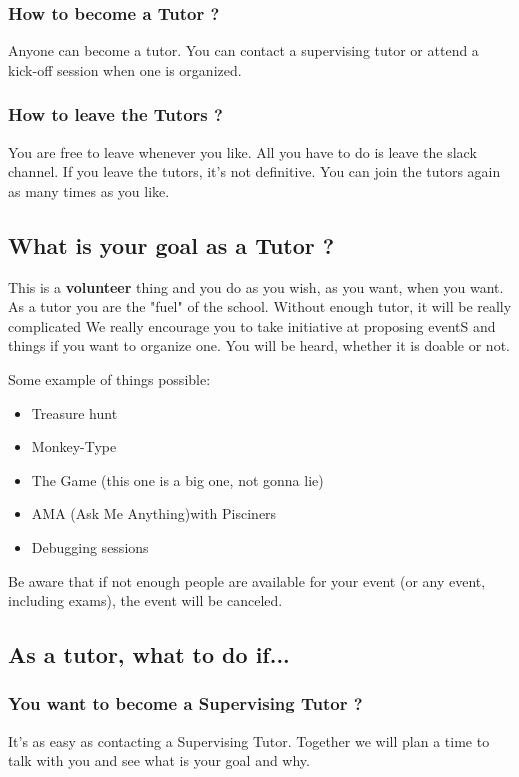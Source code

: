 \documentclass{article}
\begin{document}

\subsubsection{How to become a Tutor ?}

Anyone can become a tutor. You can contact a supervising tutor or attend a kick-off session when one is organized.

\subsubsection{How to leave the Tutors ?}

You are free to leave whenever you like. All you have to do is leave the slack channel. If you leave the tutors, it's not definitive. You can join the tutors again as many times as you like.

\subsection{What is  your goal as a Tutor ?}

This is a \textbf{volunteer} thing and you do as you wish, as you want, when you want.
As a tutor you are the "fuel" of the school. Without enough tutor, it will be really complicated
We really encourage you to take initiative at proposing eventS and things if you want to organize one.
You will be heard, whether it is doable or not.


Some example of things possible:
\begin{itemize}
    \item Treasure hunt
    \item Monkey-Type
    \item The Game (this one is a big one, not gonna lie)
    \item AMA (Ask Me Anything)with Pisciners
    \item Debugging sessions
\end{itemize}

Be aware that if not enough people are available for your event (or any event, including exams), the event will be canceled.

\subsection{As a tutor, what to do if... }
\subsubsection{You want to become a Supervising Tutor ?}
It's as easy as contacting a Supervising Tutor. Together we will plan a time to talk with you and see what is your goal and why.
\end{document}
